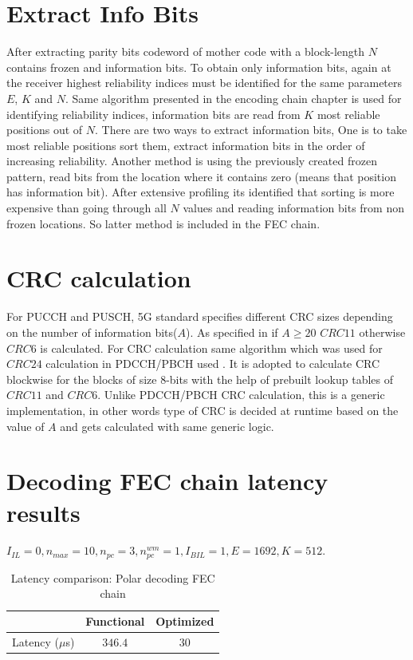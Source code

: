 \section{Extract Info Bits}
After extracting parity bits codeword of mother code with a block-length $N$ contains frozen and information bits. To obtain only information bits, again at the receiver highest reliability indices must be identified for the same parameters $E$, $K$ and $N$. Same algorithm presented in the encoding chain chapter is used for identifying reliability indices, information bits are read from $K$ most reliable positions out of $N$. There are two ways to extract information bits, One is to take most reliable positions sort them, extract information bits in the order of increasing reliability. Another method is using the previously created frozen pattern, read bits from the location where it contains zero (means that position has information bit). After extensive profiling its identified that sorting is more expensive than going through all $N$ values and reading information bits from non frozen locations. So latter method is included in the FEC chain.

\section{CRC calculation}
For PUCCH and PUSCH, 5G standard specifies different CRC sizes depending on the number of information bits($A$). As specified in \cite{3gpp.38.212} if $ A \ge 20$ $ CRC11 $  otherwise $ CRC6 $ is calculated.  For CRC calculation same algorithm which was used for $ CRC24 $ calculation in PDCCH/PBCH used \cite{Sarwate:1988:CCR:63030.63037}. It is adopted to calculate CRC blockwise for the blocks of size 8-bits with the help of prebuilt lookup tables of $ CRC11 $ and $ CRC6 $. Unlike PDCCH/PBCH CRC calculation, this is a generic implementation, in other words type of CRC is decided at runtime based on the value of $A$ and gets calculated with same generic logic.

\section{Decoding FEC chain latency results}

$I_{IL} = 0, n_{max} = 10, n_{pc} = 3 ,n_{pc}^{wm} = 1, I_{BIL} = 1, E = 1692, K = 512$.
\begin{table}[!h]
	\begin{center}
		\caption{Latency comparison: Polar decoding FEC chain}
		\label{tab:decodingFECChainLatency}
		\begin{tabular}{c|c|c} %
			\textbf{ } & Functional & Optimized \\
			\hline
			Latency ($\mu$s) & $346.4$ & $30$\\
		\end{tabular}
	\end{center}
\end{table}
